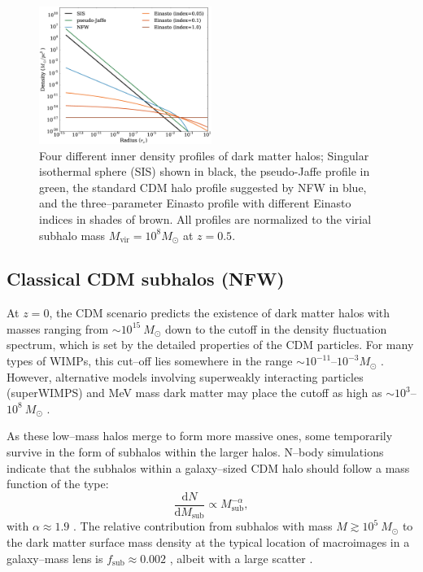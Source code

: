 \documentclass[paper=a4, fontsize=11pt]{scrartcl} %
\numberwithin{equation}{section} %
\numberwithin{figure}{section} %
\numberwithin{table}{section} %
\begin{document}
\begin{figure}
\centering
\label{fig:profiles}
\includegraphics[width=0.5\textwidth]{figs/profiles}
\caption{Four different inner density profiles of dark matter halos; Singular isothermal sphere (SIS) shown in black, the pseudo-Jaffe profile in green, the standard CDM halo profile suggested by NFW in blue, and the three--parameter Einasto profile with different Einasto indices in shades of brown. All profiles are normalized to the virial subhalo mass $M_\mathrm{vir} = 10^8 M_\odot$ at $z = 0.5$.}
\end{figure}

\subsection{Classical CDM subhalos (NFW)}
\label{NFW}
At $z=0$, the CDM scenario predicts the existence of dark matter halos with masses ranging from $\sim 10^{15}\ M_\odot$ down to the cutoff in the density fluctuation spectrum, which is set by the detailed properties of the CDM particles. For many types of WIMPs, this cut--off lies somewhere in the range $\sim 10^{-11}$--$10^{-3} M_\odot$ \cite{Bringmann}. However, alternative models involving superweakly interacting particles (superWIMPS) and MeV mass dark matter may place the cutoff as high as $\sim 10^3$--$10^8 \ M_\odot$ \cite{Hisano et al.,Hooper et al.}. 

As these low--mass halos merge to form more massive ones, some temporarily survive in the form of subhalos within the larger halos. N--body simulations indicate that the subhalos within a galaxy--sized CDM halo should follow a mass function of the type:
\begin{equation}
\frac{\mathrm{d}N}{\mathrm{d}M_\mathrm{sub}}\propto M_\mathrm{sub}^{-\alpha},
\label{subhalo mass function}
\end{equation}
with $\alpha\approx 1.9$ \cite{Springel et al.,Gao et al.}. The relative contribution from subhalos with mass $M\gtrsim 10^5\ M_\odot$ to the dark matter surface mass density at the typical location of macroimages in a galaxy--mass lens is $f_\mathrm{sub}\approx 0.002$ \cite{Xu et al. b}, albeit with a large scatter \cite{Chen et al.}. 
\end{document}
